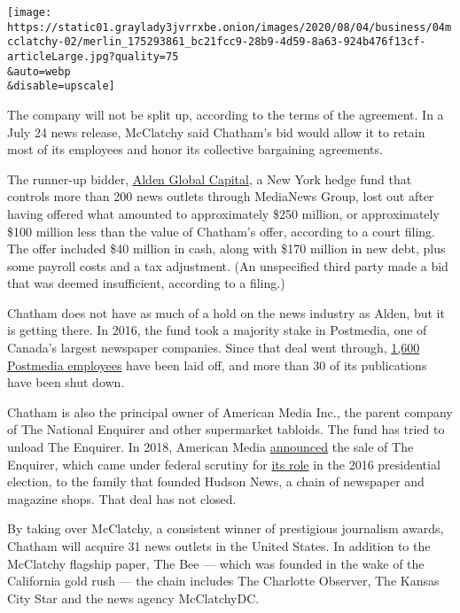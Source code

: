 \texttt{[image: https://static01.graylady3jvrrxbe.onion/images/2020/08/04/business/04mcclatchy-02/merlin\_175293861\_bc21fcc9-28b9-4d59-8a63-924b476f13cf-articleLarge.jpg?quality=75\\\&auto=webp\\\&disable=upscale]}

The company will not be split up, according to the terms of the
agreement. In a July 24 news release, McClatchy said Chatham's bid would
allow it to retain most of its employees and honor its collective
bargaining agreements.

The runner-up bidder,
\href{https://www.nytimes3xbfgragh.onion/2020/07/02/business/media/tribune-alden-board-seat.html}{Alden
Global Capital}, a New York hedge fund that controls more than 200 news
outlets through MediaNews Group, lost out after having offered what
amounted to approximately \$250 million, or approximately \$100 million
less than the value of Chatham's offer, according to a court filing. The
offer included \$40 million in cash, along with \$170 million in new
debt, plus some payroll costs and a tax adjustment. (An unspecified
third party made a bid that was deemed insufficient, according to a
filing.)

Chatham does not have as much of a hold on the news industry as Alden,
but it is getting there. In 2016, the fund took a majority stake in
Postmedia, one of Canada's largest newspaper companies. Since that deal
went through,
\href{https://www.nytimes3xbfgragh.onion/2020/07/16/business/media/hedge-fund-chatham-mcclatchy-postmedia-newspapers.html}{1,600
Postmedia employees} have been laid off, and more than 30 of its
publications have been shut down.

Chatham is also the principal owner of American Media Inc., the parent
company of The National Enquirer and other supermarket tabloids. The
fund has tried to unload The Enquirer. In 2018, American Media
\href{https://www.nytimes3xbfgragh.onion/2019/04/18/business/media/national-enquirer-james-cohen-hudson-news.html}{announced}
the sale of The Enquirer, which came under federal scrutiny for
\href{https://www.nytimes3xbfgragh.onion/2018/04/12/us/national-enquirer-doorman-trump.html}{its
role} in the 2016 presidential election, to the family that founded
Hudson News, a chain of newspaper and magazine shops. That deal has not
closed.

By taking over McClatchy, a consistent winner of prestigious journalism
awards, Chatham will acquire 31 news outlets in the United States. In
addition to the McClatchy flagship paper, The Bee --- which was founded
in the wake of the California gold rush --- the chain includes The
Charlotte Observer, The Kansas City Star and the news agency
McClatchyDC.

